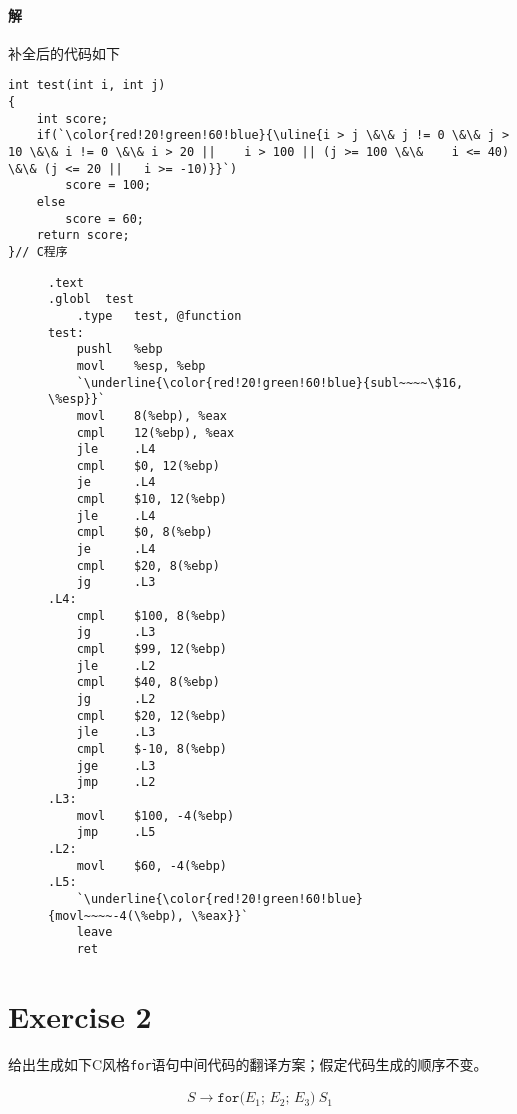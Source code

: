 \documentclass{article}
\begin{document}
\begin{multicols}{2}
    \paragraph{解}
    补全后的代码如下
    \begin{lstlisting}[style = C]
int test(int i, int j)
{
    int score;
    if(`\color{red!20!green!60!blue}{\uline{i > j \&\& j != 0 \&\& j > 10 \&\& i != 0 \&\& i > 20 ||    i > 100 || (j >= 100 \&\&    i <= 40) \&\& (j <= 20 ||   i >= -10)}}`)
        score = 100;
    else
        score = 60;
    return score;
}// C程序
    \end{lstlisting}


    \begin{figure}[H]
        \centering
        \begin{lstlisting}[style = Assembler, lineskip = 0.2em]
.text
.globl  test
    .type   test, @function
test:
    pushl   %ebp
    movl    %esp, %ebp
    `\underline{\color{red!20!green!60!blue}{subl~~~~\$16, \%esp}}`
    movl    8(%ebp), %eax
    cmpl    12(%ebp), %eax
    jle     .L4
    cmpl    $0, 12(%ebp)
    je      .L4
    cmpl    $10, 12(%ebp)
    jle     .L4
    cmpl    $0, 8(%ebp)
    je      .L4
    cmpl    $20, 8(%ebp)
    jg      .L3
.L4:
    cmpl    $100, 8(%ebp)
    jg      .L3
    cmpl    $99, 12(%ebp)
    jle     .L2
    cmpl    $40, 8(%ebp)
    jg      .L2
    cmpl    $20, 12(%ebp)
    jle     .L3
    cmpl    $-10, 8(%ebp)
    jge     .L3
    jmp     .L2
.L3:
    movl    $100, -4(%ebp)
    jmp     .L5
.L2:
    movl    $60, -4(%ebp)
.L5:
    `\underline{\color{red!20!green!60!blue}{movl~~~~-4(\%ebp), \%eax}}`
    leave
    ret
        \end{lstlisting}
    \end{figure}
\end{multicols}

\restoregeometry
\section*{Exercise 2}
给出生成如下C风格\lstinline{for}语句中间代码的翻译方案；假定代码生成的顺序不变。

\begin{align*}
    S \rightarrow \texttt{for(}E_1\texttt{; }E_2\texttt{; }E_3\texttt{)}\ S_1
\end{align*}
\end{document}
